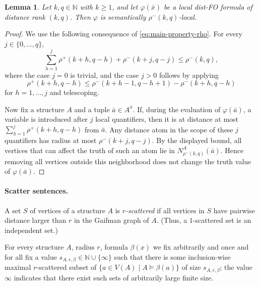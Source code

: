 \documentclass[11pt]{article}
\newtheorem{lemma}[theorem]{Lemma}
\theoremstyle{remark}
\newcommand{\set}[1]{\{#1\}}
\def\phi{\varphi}
\def\N{\mathbb N}
\renewcommand{\le}{\leqslant}
\renewcommand{\ge}{\geqslant}
\newcommand{\distFO}{\textrm{\upshape dist-FO}\xspace}
\begin{document}
\begin{lemma}\label{lem:ltp-local-subgraph}
    Let \(k,q \in \N\) with $k\ge 1$, and let
    \(\phi(\bar x)\) be a local \distFO formula of distance rank \((k,q)\).
    Then $\phi$ is semantically \(\rho^-(k,q)\)-local.
\end{lemma}
\begin{proof}
    We use the following consequence of \eqref{eq:main-property-rho}. For every
    \(j\in\{0,\ldots,q\}\),
    \[
        \sum_{h=1}^{j}\rho^+(k+h,q-h)+\rho^-(k+j,q-j)
        \le \rho^-(k,q),
    \]
    where the case \(j=0\) is trivial, and the case \(j>0\) follows by applying
    \[
        \rho^+(k+h,q-h)
        \le
        \rho^-(k+h-1,q-h+1)-\rho^-(k+h,q-h)
    \]
    for \(h=1,\ldots,j\) and telescoping.

    Now fix a structure \(A\) and a tuple \(\bar a\in A^{\bar x}\). If, during
    the evaluation of \(\phi(\bar a)\), a variable is introduced after \(j\)
    local quantifiers, then it is at distance at most
    \(\sum_{h=1}^{j}\rho^+(k+h,q-h)\) from \(\bar a\). Any distance atom in the
    scope of these \(j\) quantifiers has radius at most \(\rho^-(k+j,q-j)\).
    By the displayed bound, all vertices that can affect the truth of such an atom
    lie in \(N_{\rho^-(k,q)}^A(\bar a)\). Hence removing all vertices outside this
    neighborhood does not change the truth value of \(\phi(\bar a)\).
\end{proof}



\paragraph{Scatter sentences.}
A set \(S\) of vertices of a structure $A$ is \emph{\(r\)-scattered} if all vertices in \(S\)
have pairwise distance larger than \(r\) in the Gaifman graph of $A$. (Thus, a \(1\)-scattered set is an independent set.)

For every structure \(A\), radius \(r\), formula \(\beta(x)\)
we fix arbitrarily and once and for all
fix a value $s_{A,r,\beta}\in\N\cup\set{\infty}$ such that there is some inclusion-wise maximal \(r\)-scattered subset of \(\{ a \in V(A) \mid A \models \beta(a)\}\) of size $s_{A,r,\beta}$; the value $\infty$ indicates that there exist such sets of arbitrarily large finite size. 
\end{document}
